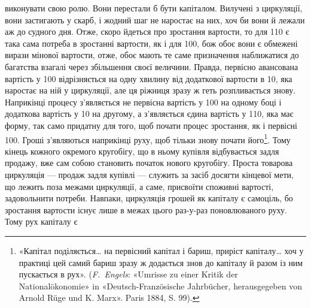 \parcont{}  %
виконувати свою ролю. Вони перестали б бути капіталом. Вилучені
з циркуляції, вони застигають у скарб, і жодний шаг не наростає
на них, хоч би вони й лежали аж до судного дня. Отже,
скоро йдеться про зростання вартости, то для 110
є така сама потреба в зростанні вартости, як і для 100, бож обоє вони є обмежені вирази мінової вартости,
отже, обоє мають те саме призначення наближатися до багатства
взагалі через збільшення своєї величини. Правда, первісно авансована
вартість у 100 відрізняється на одну хвилину
від додаткової вартости в 10, яка наростає
на ній у циркуляції, але ця ріжниця зразу ж геть розпливається
знову. Наприкінці процесу з’являється не первісна вартість
у 100 на одному боці і додаткова вартість у
10 на другому, а з’являється єдина вартість у
110, яка має форму, так само придатну для того,
щоб почати процес зростання, як і первісні 100.
Гроші з’являються наприкінці руху, щоб тільки знову почати
його\footnote{
«Капітал поділяється\dots{} на первісний капітал і бариш, приріст
капіталу\dots{} хоч у практиці цей самий бариш зразу ж додається знов до
капіталу й разом із ним пускається в рух». (\emph{F.~Engels}: «Umrisse zu
einer Kritik der Nationalökonomie» in «Deutsch-Französische Jahrbücher,
herausgegeben von Arnold Rüge und K. Marx». Paris 1884, S. 99).
}. Тому кінець кожного окремого кругобігу, що в ньому
купівля відбувається задля продажу, вже сам собою становить
початок нового кругобігу. Проста товарова циркуляція — продаж
задля купівлі — служить за засіб досягти кінцевої мети,
що лежить поза межами циркуляції, а саме, присвоїти споживні
вартості, задовольнити потреби. Навпаки, циркуляція грошей
як капіталу є самоціль, бо зростання вартости існує лише в межах
цього раз-у-раз поновлюваного руху. Тому рух капіталу є
